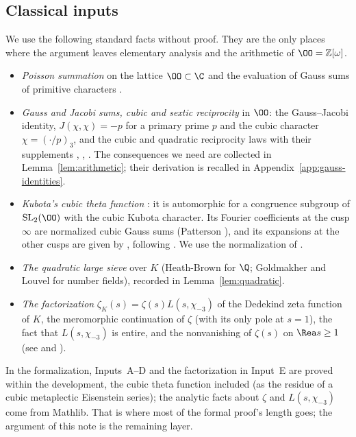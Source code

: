 \subsection{Classical inputs}\label{sec:inputs}
We use the following standard facts without proof. They are the only places where the
argument leaves elementary analysis and the arithmetic of $\OO=\mathbb Z[\omega]$.
\begin{itemize}
\item[\textbf{A.}] \emph{Poisson summation} on the lattice $\OO\subset\C$ and the evaluation of
Gauss sums of primitive characters \cite[(3.12) and Theorem~4.5]{IK04}.
\item[\textbf{B.}] \emph{Gauss and Jacobi sums, cubic and sextic reciprocity} in $\OO$:
the Gauss--Jacobi identity, $J(\chi,\chi)=-p$ for a primary prime $p$ and the cubic
character $\chi=(\cdot/p)_3$, and the cubic and quadratic reciprocity laws with their
supplements \cite[Chapters~8 and~9]{IR90}, \cite[\S3]{IK04}, \cite[(1.5)]{DR}. The
consequences we need are collected in Lemma~\ref{lem:arithmetic}; their derivation is
recalled in Appendix~\ref{app:gauss-identities}.
\item[\textbf{C.}] \emph{Kubota's cubic theta function} \cite{Kub69}: it is automorphic for
a congruence subgroup of $\mathrm{SL}_2(\OO)$ with the cubic Kubota character. Its Fourier
coefficients at the cusp $\infty$ are normalized cubic Gauss sums (Patterson
\cite[Theorem~8.1]{Pat77}), and its expansions at the other cusps are given by
\cite[\S5 and Appendix~A]{DR}, following \cite[Table~III]{Pat77}. We use the normalization
of \cite[\S5.1]{DR}.
\item[\textbf{D.}] \emph{The quadratic large sieve} over $K$ (Heath-Brown \cite{HB95} for
$\Q$; Goldmakher and Louvel \cite[Theorem~1.1]{GL} for number fields), recorded in
Lemma~\ref{lem:quadratic}.
\item[\textbf{E.}] \emph{The factorization} $\zeta_K(s)=\zeta(s)L(s,\chi_{-3})$ of the
Dedekind zeta function of $K$, the meromorphic continuation of $\zeta$ (with its only pole
at $s=1$), the fact that $L(s,\chi_{-3})$ is entire, and the nonvanishing of $\zeta(s)$ on $\Rea s\ge1$ (see \cite[Chapter~5]{IK04} and \cite{Dav00}).
\end{itemize}
In the formalization, Inputs~A--D and the factorization in Input~E are proved within the
development, the cubic theta function included (as the residue of a cubic metaplectic
Eisenstein series); the analytic facts about $\zeta$ and $L(s,\chi_{-3})$ come from Mathlib.
That is where most of the formal proof's length goes; the argument of this note is the
remaining layer.

